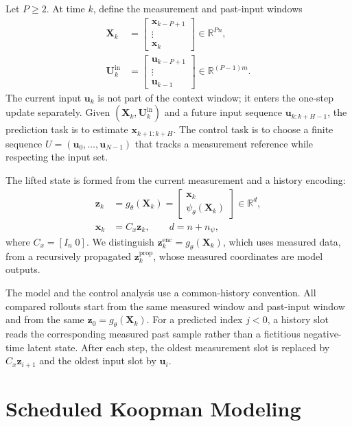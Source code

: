 \documentclass[journal]{IEEEtran}
\newcommand{\vx}{\mathbf{x}}
\newcommand{\vu}{\mathbf{u}}
\newcommand{\vz}{\mathbf{z}}
\newcommand{\mU}{\mathbf{U}}
\newcommand{\mX}{\mathbf{X}}
\newcommand{\R}{\mathbb{R}}
\begin{document}
Let $P\ge2$. At time $k$, define the measurement and past-input windows
\begin{align}
    \mX_k&=\begin{bmatrix}\vx_{k-P+1}\\ \vdots\\ \vx_k\end{bmatrix}\in\R^{Pn},
    \label{eq:measurement_window}\\
    \mU_k^{\mathrm{in}}&=\begin{bmatrix}\vu_{k-P+1}\\ \vdots\\ \vu_{k-1}\end{bmatrix}\in\R^{(P-1)m}.
    \label{eq:history_windows}
\end{align}
The current input $\vu_k$ is not part of the context window; it enters the one-step update separately. Given $(\mX_k,\mU_k^{\mathrm{in}})$ and a future input sequence $\vu_{k:k+H-1}$, the prediction task is to estimate $\vx_{k+1:k+H}$. The control task is to choose a finite sequence $U=(\vu_0,\ldots,\vu_{N-1})$ that tracks a measurement reference while respecting the input set.

The lifted state is formed from the current measurement and a history encoding:
\begin{align}
    \vz_k&=g_\theta(\mX_k)=\begin{bmatrix}\vx_k\\ \psi_\theta(\mX_k)\end{bmatrix}\in\R^d,
    \label{eq:state_preserving_lifting}\\
    \vx_k&=C_x\vz_k,\qquad d=n+n_\psi,
    \label{eq:state_readout}
\end{align}
where $C_x=[I_n\;0]$. We distinguish $\vz_k^{\mathrm{enc}}=g_\theta(\mX_k)$, which uses measured data, from a recursively propagated $\vz_k^{\mathrm{prop}}$, whose measured coordinates are model outputs.

The model and the control analysis use a common-history convention. All compared rollouts start from the same measured window and past-input window and from the same $\vz_0=g_\theta(\mX_k)$. For a predicted index $j<0$, a history slot reads the corresponding measured past sample rather than a fictitious negative-time latent state. After each step, the oldest measurement slot is replaced by $C_x\vz_{i+1}$ and the oldest input slot by $\vu_i$.

\section{Scheduled Koopman Modeling}
\label{sec:model}
\end{document}
